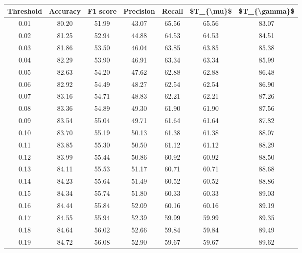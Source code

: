 \begin{tabular}{|c|c|c|c|c|c|c|}
\hline
 Threshold &  Accuracy &  F1 score &  Precision &  Recall &  \$T\_\{\textbackslash mu\}\$ &  \$T\_\{\textbackslash gamma\}\$ \\
\hline
      0.01 &     80.20 &     51.99 &      43.07 &   65.56 &      65.56 &         83.07 \\
      0.02 &     81.25 &     52.94 &      44.88 &   64.53 &      64.53 &         84.51 \\
      0.03 &     81.86 &     53.50 &      46.04 &   63.85 &      63.85 &         85.38 \\
      0.04 &     82.29 &     53.90 &      46.91 &   63.34 &      63.34 &         85.99 \\
      0.05 &     82.63 &     54.20 &      47.62 &   62.88 &      62.88 &         86.48 \\
      0.06 &     82.92 &     54.49 &      48.27 &   62.54 &      62.54 &         86.90 \\
      0.07 &     83.16 &     54.71 &      48.83 &   62.21 &      62.21 &         87.26 \\
      0.08 &     83.36 &     54.89 &      49.30 &   61.90 &      61.90 &         87.56 \\
      0.09 &     83.54 &     55.04 &      49.71 &   61.64 &      61.64 &         87.82 \\
      0.10 &     83.70 &     55.19 &      50.13 &   61.38 &      61.38 &         88.07 \\
      0.11 &     83.85 &     55.30 &      50.50 &   61.12 &      61.12 &         88.29 \\
      0.12 &     83.99 &     55.44 &      50.86 &   60.92 &      60.92 &         88.50 \\
      0.13 &     84.11 &     55.53 &      51.17 &   60.71 &      60.71 &         88.68 \\
      0.14 &     84.23 &     55.64 &      51.49 &   60.52 &      60.52 &         88.86 \\
      0.15 &     84.34 &     55.74 &      51.80 &   60.33 &      60.33 &         89.03 \\
      0.16 &     84.44 &     55.84 &      52.09 &   60.16 &      60.16 &         89.19 \\
      0.17 &     84.55 &     55.94 &      52.39 &   59.99 &      59.99 &         89.35 \\
      0.18 &     84.64 &     56.02 &      52.66 &   59.84 &      59.84 &         89.49 \\
      0.19 &     84.72 &     56.08 &      52.90 &   59.67 &      59.67 &         89.62 \\

\end{tabular}
